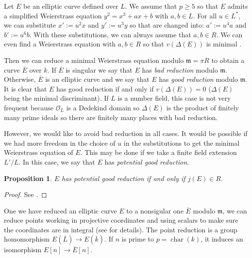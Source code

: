 \documentclass[a4paper,10pt]{report}
\theoremstyle{definition}
\theoremstyle{plain}
\newtheorem{proposition}[definition]{Proposition}
\theoremstyle{definition}
\newcommand{\mO}{\mathcal{O}}
\renewcommand{\(}{\left(}
\renewcommand{\)}{\right)}
\newcommand{\mfm}{\mathfrak{m}}
\DeclareMathOperator{\Char}{char}%
\begin{document}
Let $E$ be an elliptic curve defined over $L$.  We assume that $p\geq 5$ so that $E$ admits a simplified Weierstrass equation $y^2=x^3+ax+b$ with $a,b\in L$.  For all $u\in L^*$,  we can substitute $x':=u^2 x$ and $y':=u^3 y$ so that are changed into: $a':=u^4a$ and  $b':=u^6b$.  With these substitutions,  we can always assume that $a, b\in R$.  We can even find a Weierstrass equation with $a, b\in R$ so that $v(\Delta(E))$ is minimal \cite[proposition VII.1.3.(a)]{Silverman1}.  

Then we can reduce a minimal Weierstrass equation modulo $\mfm=\pi R$ to obtain a curve $\overline{E}$ over $k$.  If $\overline{E}$ is singular we say that $E$ has \emph{bad reduction} modulo $\mfm$.  Otherwise,  $\overline{E}$ is an elliptic curve and we say that $E$ has \emph{good reduction} modulo $\mfm$.  It is clear that $E$ has good reduction if and only if $v(\Delta(E))=0$ ($\Delta(E)$ being the minimal discriminant).  If $L$ is a number field,  this case is not very frequent because $\mO_L$ is a Dedekind domain so $\Delta(E)$ is the product of finitely many prime ideals so there are finitely many places with bad reduction.

However,  we would like to avoid bad reduction in all cases.  It would be possible if we had more freedom in the choice of $u$ in the substitutions to get the minimal Weierstrass equation of $E$.  This may be done if we take a finite field extension $L'/L$.  In this case, we say that $E$ has \emph{potential good reduction}.

\begin{proposition}\label{proposition 1}
$E$ has potential good reduction if and only if $j(E)\in R$. 
\end{proposition}

\begin{proof}
See \cite[proposition VII.5.5]{Silverman1}.
\end{proof}

One we have reduced an elliptic curve $E$ to a nonsigular one $\overline{E}$ modulo $\mfm$,  we can reduce points working in projective coordinates and using scalars to make sure the coordinates are in integral (see \cite[VII.2 and VII.3]{Silverman1} for details).  The point reduction is a group homomorphism $E(\overline{L})\longrightarrow E(\overline{k})$.  If $n$ is prime to $p=\Char(k)$,  it induces an isomorphism $E[n]\longrightarrow \overline{E}[n]$.  
\end{document}
